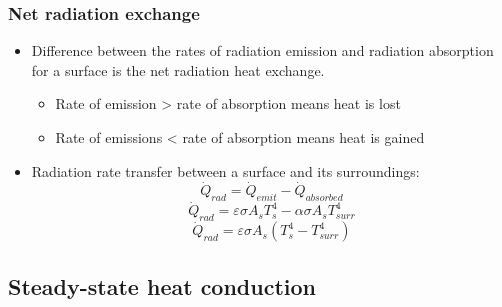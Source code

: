 \documentclass[11pt]{article}
\begin{document}
\subsubsection{Net radiation exchange}
\label{sec:orga681a31}
\begin{itemize}
\item Difference between the rates of radiation emission and radiation absorption for a surface is the net radiation heat exchange.
\begin{itemize}
\item Rate of emission > rate of absorption means heat is lost
\item Rate of emissions < rate of absorption means heat is gained
\end{itemize}
\item Radiation rate transfer between a surface and its surroundings:
\[\dot{Q}_{rad} = \dot{Q}_{emit} - \dot{Q}_{absorbed}\]
\[\dot{Q}_{rad} = \varepsilon \sigma A_s T_s^4 - \alpha \sigma A_s T_{surr}^4\]
\[\dot{Q}_{rad} = \varepsilon \sigma A_s \left(T_s^4 - T_{surr}^4 \right)\]
\end{itemize}

 \newpage

\subsection{Steady-state heat conduction}
\label{sec:org5949ba5}
\end{document}
